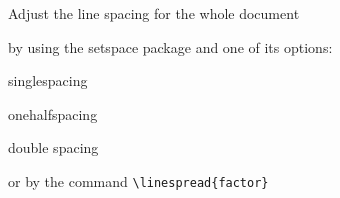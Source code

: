 \documentclass{article}
\begin{document}
\begin{compactenum}
  \setcounter{enumi}{3}
  \item Adjust the line spacing for the whole document
  \begin{compactitem}
    \item by using the setspace package and one of its options:
      \begin{inparaenum}
      \item singlespacing
      \item onehalfspacing
      \item double spacing
      \end{inparaenum}
    \item or by the command \verb|\linespread{factor}|
  \end{compactitem}
\end{compactenum}
\end{document}
